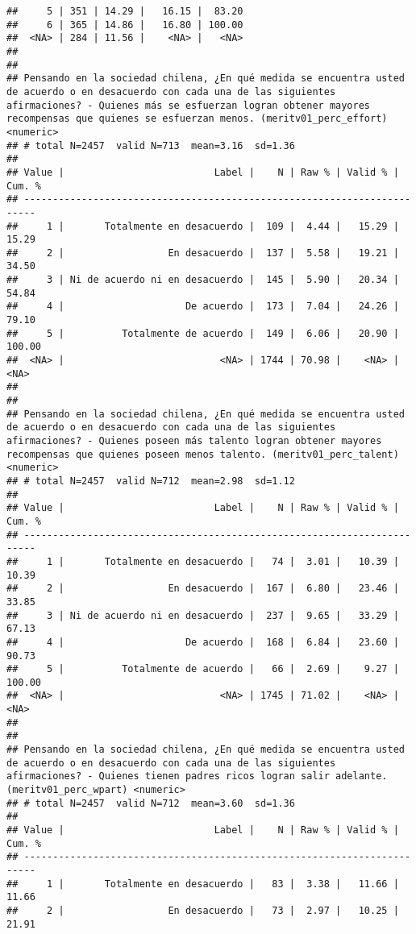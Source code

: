 \documentclass[
  10,
  landscape,
  legalpaper]{article}
\begin{document}
\begin{verbatim}
##     5 | 351 | 14.29 |   16.15 |  83.20
##     6 | 365 | 14.86 |   16.80 | 100.00
##  <NA> | 284 | 11.56 |    <NA> |   <NA>
## 
## 
## Pensando en la sociedad chilena, ¿En qué medida se encuentra usted de acuerdo o en desacuerdo con cada una de las siguientes afirmaciones? - Quienes más se esfuerzan logran obtener mayores recompensas que quienes se esfuerzan menos. (meritv01_perc_effort) <numeric>
## # total N=2457  valid N=713  mean=3.16  sd=1.36
## 
## Value |                          Label |    N | Raw % | Valid % | Cum. %
## ------------------------------------------------------------------------
##     1 |       Totalmente en desacuerdo |  109 |  4.44 |   15.29 |  15.29
##     2 |                  En desacuerdo |  137 |  5.58 |   19.21 |  34.50
##     3 | Ni de acuerdo ni en desacuerdo |  145 |  5.90 |   20.34 |  54.84
##     4 |                     De acuerdo |  173 |  7.04 |   24.26 |  79.10
##     5 |          Totalmente de acuerdo |  149 |  6.06 |   20.90 | 100.00
##  <NA> |                           <NA> | 1744 | 70.98 |    <NA> |   <NA>
## 
## 
## Pensando en la sociedad chilena, ¿En qué medida se encuentra usted de acuerdo o en desacuerdo con cada una de las siguientes afirmaciones? - Quienes poseen más talento logran obtener mayores recompensas que quienes poseen menos talento. (meritv01_perc_talent) <numeric>
## # total N=2457  valid N=712  mean=2.98  sd=1.12
## 
## Value |                          Label |    N | Raw % | Valid % | Cum. %
## ------------------------------------------------------------------------
##     1 |       Totalmente en desacuerdo |   74 |  3.01 |   10.39 |  10.39
##     2 |                  En desacuerdo |  167 |  6.80 |   23.46 |  33.85
##     3 | Ni de acuerdo ni en desacuerdo |  237 |  9.65 |   33.29 |  67.13
##     4 |                     De acuerdo |  168 |  6.84 |   23.60 |  90.73
##     5 |          Totalmente de acuerdo |   66 |  2.69 |    9.27 | 100.00
##  <NA> |                           <NA> | 1745 | 71.02 |    <NA> |   <NA>
## 
## 
## Pensando en la sociedad chilena, ¿En qué medida se encuentra usted de acuerdo o en desacuerdo con cada una de las siguientes afirmaciones? - Quienes tienen padres ricos logran salir adelante. (meritv01_perc_wpart) <numeric>
## # total N=2457  valid N=712  mean=3.60  sd=1.36
## 
## Value |                          Label |    N | Raw % | Valid % | Cum. %
## ------------------------------------------------------------------------
##     1 |       Totalmente en desacuerdo |   83 |  3.38 |   11.66 |  11.66
##     2 |                  En desacuerdo |   73 |  2.97 |   10.25 |  21.91

\end{verbatim}
\end{document}
